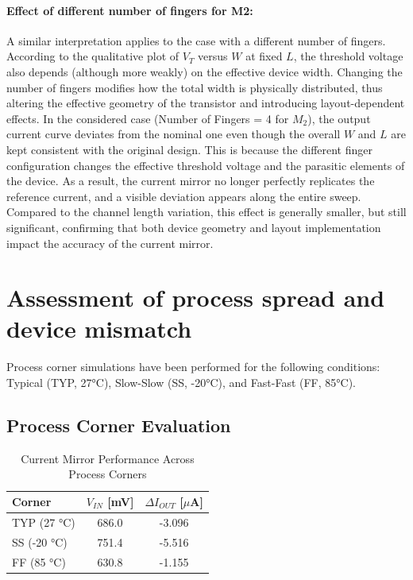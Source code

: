 \paragraph{Effect of different number of fingers for M2:}
A similar interpretation applies to the case with a different number of fingers. According to the qualitative plot of $V_T$ versus $W$ at fixed $L$, the threshold voltage also depends (although more weakly) on the effective device width. Changing the number of fingers modifies how the total width is physically distributed, thus altering the effective geometry of the transistor and introducing layout-dependent effects. In the considered case (Number of Fingers = 4 for $M_2$), the output current curve deviates from the nominal one even though the overall $W$ and $L$ are kept consistent with the original design. This is because the different finger configuration changes the effective threshold voltage and the parasitic elements of the device. As a result, the current mirror no longer perfectly replicates the reference current, and a visible deviation appears along the entire sweep. Compared to the channel length variation, this effect is generally smaller, but still significant, confirming that both device geometry and layout implementation impact the accuracy of the current mirror.



\section{Assessment of process spread and device mismatch }
Process corner simulations have been performed for the following conditions: Typical (TYP, 27°C), Slow-Slow (SS, -20°C), and Fast-Fast (FF, 85°C).

\subsection{Process Corner Evaluation}

\begin{table}[h!]
\centering
\caption{Current Mirror Performance Across Process Corners}
\label{table:corners_corrected}
\begin{tabular}{|l|c|c|}
\hline
\textbf{Corner} & \textbf{$V_{IN}$ [mV]} & \textbf{$\Delta I_{OUT}$ [$\mu$A]} \\ \hline
TYP (27 °C)     & 686.0                  & -3.096                             \\ \hline
SS (-20 °C)     & 751.4                  & -5.516                             \\ \hline
FF (85 °C)      & 630.8                  & -1.155                             \\ \hline
\end{tabular}
\end{table}




